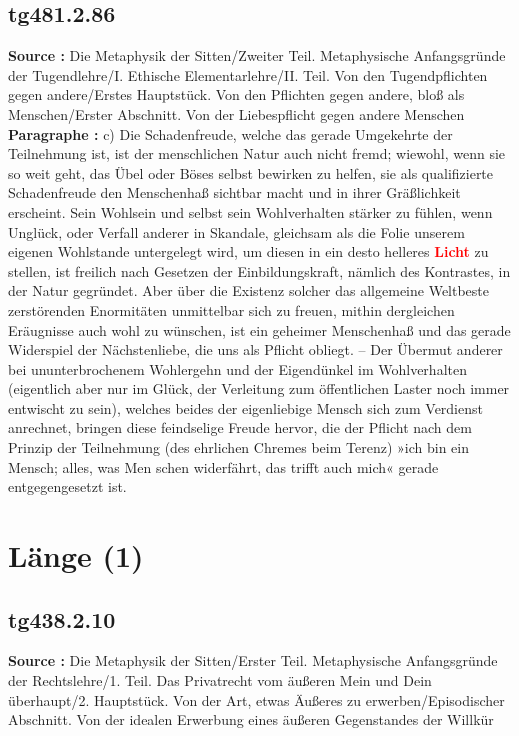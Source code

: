 \documentclass[a4paper,12pt,twoside]{book}
\newcommand{\match}[1]{\textcolor{red}{\textbf{#1}}}
\newcommand{\unnumberedsection}[1]{
	\section*{#1}
	\addcontentsline{toc}{section}{#1}
	\markright{#1}
}
\begin{document}
	\subsection*{tg481.2.86} 
	\textbf{Source : }Die Metaphysik der Sitten/Zweiter Teil. Metaphysische Anfangsgründe der Tugendlehre/I. Ethische Elementarlehre/II. Teil. Von den Tugendpflichten gegen andere/Erstes Hauptstück. Von den Pflichten gegen andere, bloß als Menschen/Erster Abschnitt. Von der Liebespflicht gegen andere Menschen\\  
	
	\textbf{Paragraphe : }c) Die Schadenfreude, welche das gerade Umgekehrte der Teilnehmung ist, ist der menschlichen Natur auch nicht fremd; wiewohl, wenn sie so weit geht, das Übel oder Böses selbst bewirken zu helfen, sie als qualifizierte Schadenfreude den Menschenhaß sichtbar macht und in ihrer Gräßlichkeit erscheint. Sein Wohlsein und selbst sein Wohlverhalten stärker zu fühlen, wenn Unglück, oder Verfall  anderer in Skandale, gleichsam als die Folie unserem eigenen Wohlstande untergelegt wird, um diesen in ein desto helleres \match{Licht} zu stellen, ist freilich nach Gesetzen der Einbildungskraft, nämlich des Kontrastes, in der Natur gegründet. Aber über die Existenz solcher das allgemeine Weltbeste zerstörenden Enormitäten unmittelbar sich zu freuen, mithin dergleichen Eräugnisse auch wohl zu wünschen, ist ein geheimer Menschenhaß und das gerade Widerspiel der Nächstenliebe, die uns als Pflicht obliegt. – Der Übermut anderer bei ununterbrochenem Wohlergehn und der Eigendünkel im Wohlverhalten (eigentlich aber nur im Glück, der Verleitung zum öffentlichen Laster noch immer entwischt zu sein), welches beides der eigenliebige Mensch sich zum Verdienst anrechnet, bringen diese feindselige Freude hervor, die der Pflicht nach dem Prinzip der Teilnehmung (des ehrlichen Chremes beim Terenz) »ich bin ein Mensch; alles, was Men schen widerfährt, das trifft auch mich« gerade entgegengesetzt ist. 
	
	\unnumberedsection{Länge (1)} 
	\subsection*{tg438.2.10} 
	\textbf{Source : }Die Metaphysik der Sitten/Erster Teil. Metaphysische Anfangsgründe der Rechtslehre/1. Teil. Das Privatrecht vom äußeren Mein und Dein überhaupt/2. Hauptstück. Von der Art, etwas Äußeres zu erwerben/Episodischer Abschnitt. Von der idealen Erwerbung eines äußeren Gegenstandes der Willkür\\  
	
\end{document}
